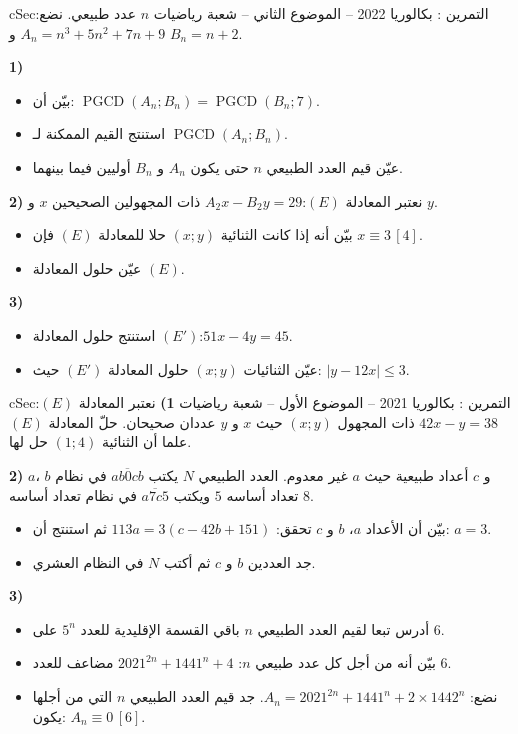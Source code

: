 \documentclass[12pt,a4paper]{article}
\newenvironment{BOX}[2]{\begin{otherlanguage}{english}\begin{arbox}{#1}{#2}}{\end{arbox}\end{otherlanguage}}
\newcounter{exo}
\newenvironment{tamrin}[1]{\stepcounter{exo}\begin{BOX}{cSec}{التمرين \theexo: #1}}{\end{BOX}}
\newcommand{\pgcd}{\operatorname{PGCD}}
\newenvironment{sq}{\begin{itemize}[leftmargin=2.4em,itemsep=3pt]}{\end{itemize}}
\newcommand{\qa}{\item[(أ)]}\newcommand{\qb}{\item[(ب)]}\newcommand{\qc}{\item[(جـ)]}\newcommand{\qd}{\item[(د)]}\newcommand{\qe}{\item[(هـ)]}
\begin{document}
\begin{tamrin}{بكالوريا 2022 -- الموضوع الثاني -- شعبة رياضيات}
$n$ عدد طبيعي. نضع: $A_n=n^3+5n^2+7n+9$ و $B_n=n+2$.

\textbf{1)}
\begin{sq}
\qa بيّن أن: $\pgcd(A_n;B_n)=\pgcd(B_n;7)$.
\qb استنتج القيم الممكنة لـ $\pgcd(A_n;B_n)$.
\qc عيّن قيم العدد الطبيعي $n$ حتى يكون $A_n$ و $B_n$ أوليين فيما بينهما.
\end{sq}
\textbf{2)} نعتبر المعادلة $(E)$:\quad $A_2x-B_2y=29$ ذات المجهولين الصحيحين $x$ و $y$.
\begin{sq}
\qa بيّن أنه إذا كانت الثنائية $(x;y)$ حلا للمعادلة $(E)$ فإن $x\equiv3\,[4]$.
\qb عيّن حلول المعادلة $(E)$.
\end{sq}
\textbf{3)}
\begin{sq}
\qa استنتج حلول المعادلة $(E')$:\quad $51x-4y=45$.
\qb عيّن الثنائيات $(x;y)$ حلول المعادلة $(E')$ حيث: $|y-12x|\le3$.
\end{sq}
\end{tamrin}

\begin{tamrin}{بكالوريا 2021 -- الموضوع الأول -- شعبة رياضيات}
\textbf{1)} نعتبر المعادلة $(E)$:\quad $42x-y=38$ ذات المجهول $(x;y)$ حيث $x$ و $y$ عددان صحيحان.
حلّ المعادلة $(E)$ علما أن الثنائية $(1;4)$ حل لها.

\textbf{2)} $a$، $b$ و $c$ أعداد طبيعية حيث $a$ غير معدوم.
العدد الطبيعي $N$ يكتب $\overline{ab0cb}$ في نظام تعداد أساسه $5$ ويكتب $\overline{a7c5}$ في نظام تعداد أساسه $8$.
\begin{sq}
\qa بيّن أن الأعداد $a$، $b$ و $c$ تحقق: $113a=3(c-42b+151)$ ثم استنتج أن: $a=3$.
\qb جد العددين $b$ و $c$ ثم أكتب $N$ في النظام العشري.
\end{sq}
\textbf{3)}
\begin{sq}
\qa أدرس تبعا لقيم العدد الطبيعي $n$ باقي القسمة الإقليدية للعدد $5^n$ على $6$.
\qb بيّن أنه من أجل كل عدد طبيعي $n$: $2021^{2n}+1441^n+4$ مضاعف للعدد $6$.
\qc نضع: $A_n=2021^{2n}+1441^n+2\times1442^n$. جد قيم العدد الطبيعي $n$ التي من أجلها يكون: $A_n\equiv0\,[6]$.
\end{sq}
\end{tamrin}
\end{document}
